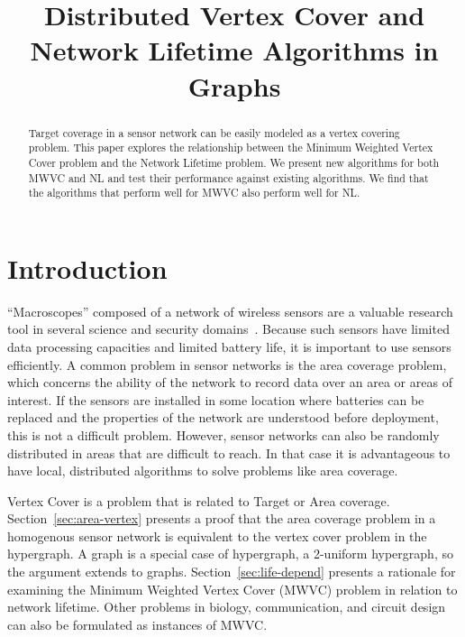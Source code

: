 

\title{Distributed Vertex Cover and Network Lifetime Algorithms in Graphs} 

\author{
}

\maketitle

\begin{abstract}
  Target coverage in a sensor network can be easily modeled as a vertex covering problem. This paper explores the relationship between the Minimum Weighted Vertex Cover problem and the Network Lifetime problem. We present new algorithms for both MWVC and NL and test their performance against existing algorithms. We find that the algorithms that perform well for MWVC also perform well for NL.
\end{abstract}
\section{Introduction}
``Macroscopes'' composed of a network of wireless sensors are a valuable research tool in several science and security domains~\cite{1098925,990703}. Because such sensors have limited data processing capacities and limited battery life, it is important to use sensors efficiently. A common problem in sensor networks is the area coverage problem, which concerns the ability of the network to record data over an area or areas of interest. If the sensors are installed in some location where batteries can be replaced and the properties of the network are understood before deployment, this is not a difficult problem. However, sensor networks can also be randomly distributed in areas that are difficult to reach. In that case it is advantageous to have local, distributed algorithms to solve problems like area coverage.

Vertex Cover is a problem that is related to Target or Area coverage. Section~\ref{sec:area-vertex} presents a proof that the area coverage problem in a homogenous sensor network is equivalent to the vertex cover problem in the hypergraph. A graph is a special case of hypergraph, a 2-uniform hypergraph, so the argument extends to graphs. Section~\ref{sec:life-depend} presents a rationale for examining the Minimum Weighted Vertex Cover (MWVC) problem in relation to network lifetime. Other problems in biology, communication, and circuit design can also be formulated as instances of MWVC.

